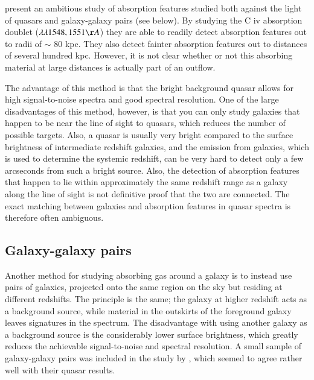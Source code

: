 \documentclass[a4wide,12pt]{book}
\begin{document}
{\citet{adelberger-2005CIV} present an ambitious study of absorption features studied both against the light of quasars and galaxy-galaxy pairs (see below). By studying the C {\sc iv} absorption doublet ($\lambda \lambda 1548, 1551 \AA$) they are able to readily detect absorption features out to radii of $\sim$ 80 kpc. They also detect fainter absorption features out to distances of several hundred kpc. However, it is not clear whether or not this absorbing material at large distances is actually part of an outflow. 

The advantage of this method is that the bright background quasar allows for high signal-to-noise spectra and good spectral resolution. 
One of the large disadvantages of this method, however, is that you can only study galaxies that happen to be near the line of sight to quasars, which reduces the number of possible targets. Also, a quasar is usually very bright compared to the surface brightness of intermediate redshift galaxies, and the emission from galaxies, which is used to determine the systemic redshift, can be very hard to detect only a few arcseconds from such a bright source. Also, the detection of absorption features that happen to lie within approximately the same redshift range as a galaxy along the line of sight is not definitive proof that the two are connected. The exact matching between galaxies and absorption features in quasar spectra is therefore often ambiguous. 

\subsection{Galaxy-galaxy pairs}

Another method for studying absorbing gas around a galaxy is to instead use pairs of galaxies, projected onto the same region on the sky but residing at different redshifts. The principle is the same; the galaxy at higher redshift acts as a background source, while material in the outskirts of the foreground galaxy leaves signatures in the spectrum. The disadvantage with using another galaxy as a background source is the considerably lower surface brightness, which greatly reduces the achievable signal-to-noise and spectral resolution.  A small sample of galaxy-galaxy pairs was included in the study by \citet{adelberger-2005CIV}, which seemed to agree rather well with their quasar results.

}
\end{document}
